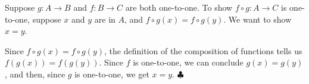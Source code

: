 \begin{Solution}{11.4}
Suppose $g : A\to B$ and $f : B \to C$ are both one{-}to{-}one. To show $f\circ g: A \to C$ is one{-}to{-}one, suppose
$x$ and $y$  are in $A$, and $f\circ g(x) = f\circ g(y)$. We want to show $x=y$.

Since $f\circ g(x) = f\circ g(y)$,  the definition of the composition of functions tells us $f(g(x)) = f(g(y))$. Since $f$ is
one{-}to{-}one, we can conclude $g(x) = g(y)$, and then, since $g$ is one{-}to{-}one, we get $x=y$. $\clubsuit$

\end{Solution}
